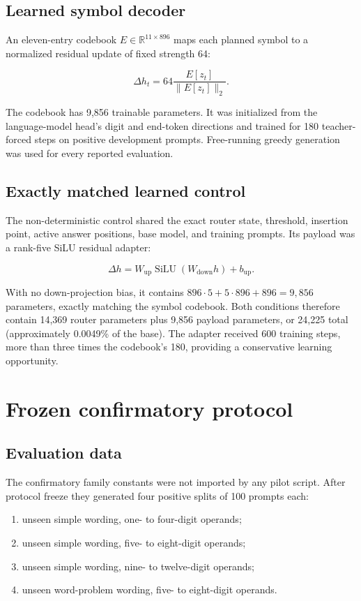 \documentclass[11pt]{article}
\begin{document}
\subsection{Learned symbol decoder}

An eleven-entry codebook \(E\in\mathbb{R}^{11\times896}\) maps each planned
symbol to a normalized residual update of fixed strength 64:

\[
\Delta h_t = 64\frac{E[z_t]}{\lVert E[z_t]\rVert_2}.
\]

The codebook has 9,856 trainable parameters. It was initialized from the
language-model head's digit and end-token directions and trained for 180
teacher-forced steps on positive development prompts. Free-running greedy
generation was used for every reported evaluation.

\subsection{Exactly matched learned control}

The non-deterministic control shared the exact router state, threshold,
insertion point, active answer positions, base model, and training prompts.
Its payload was a rank-five SiLU residual adapter:

\[
\Delta h = W_{\mathrm{up}}\operatorname{SiLU}(W_{\mathrm{down}}h)+b_{\mathrm{up}}.
\]

With no down-projection bias, it contains
\(896\cdot5 + 5\cdot896 + 896=9{,}856\) parameters, exactly matching the
symbol codebook. Both conditions therefore contain 14,369 router parameters
plus 9,856 payload parameters, or 24,225 total
(approximately 0.0049\% of the base). The adapter received 600 training
steps, more than three times the codebook's 180, providing a conservative
learning opportunity.

\section{Frozen confirmatory protocol}

\subsection{Evaluation data}

The confirmatory family constants were not imported by any pilot script.
After protocol freeze they generated four positive splits of 100 prompts each:

\begin{enumerate}
  \item unseen simple wording, one- to four-digit operands;
  \item unseen simple wording, five- to eight-digit operands;
  \item unseen simple wording, nine- to twelve-digit operands;
  \item unseen word-problem wording, five- to eight-digit operands.
\end{enumerate}
\end{document}

